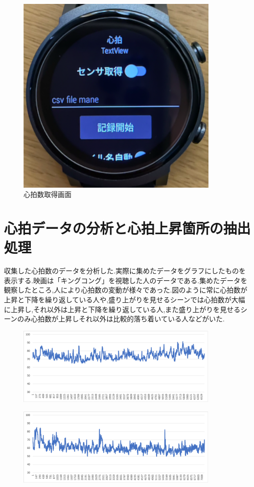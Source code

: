 \begin{figure}[H]
    \centering
    \includegraphics[width=10cm]{images/chapter3/tokei_real.png}
    \caption{心拍数取得画面}
\end{figure}

\section{心拍データの分析と心拍上昇箇所の抽出処理}
収集した心拍数のデータを分析した.実際に集めたデータをグラフにしたものを表示する.映画は「キングコング」を視聴した人のデータである.集めたデータを観察したところ,人により心拍数の変動が様々であった.図のように常に心拍数が上昇と下降を繰り返している人や,盛り上がりを見せるシーンでは心拍数が大幅に上昇し,それ以外は上昇と下降を繰り返している人,また盛り上がりを見せるシーンのみ心拍数が上昇しそれ以外は比較的落ち着いている人などがいた.
\begin{figure}[H]
    \centering
    \includegraphics[width=10cm]{images/chapter3/gurafu1.png}
\end{figure}

\begin{figure}[H]
    \centering
    \includegraphics[width=10cm]{images/chapter3/gurafu2.png}
\end{figure}

